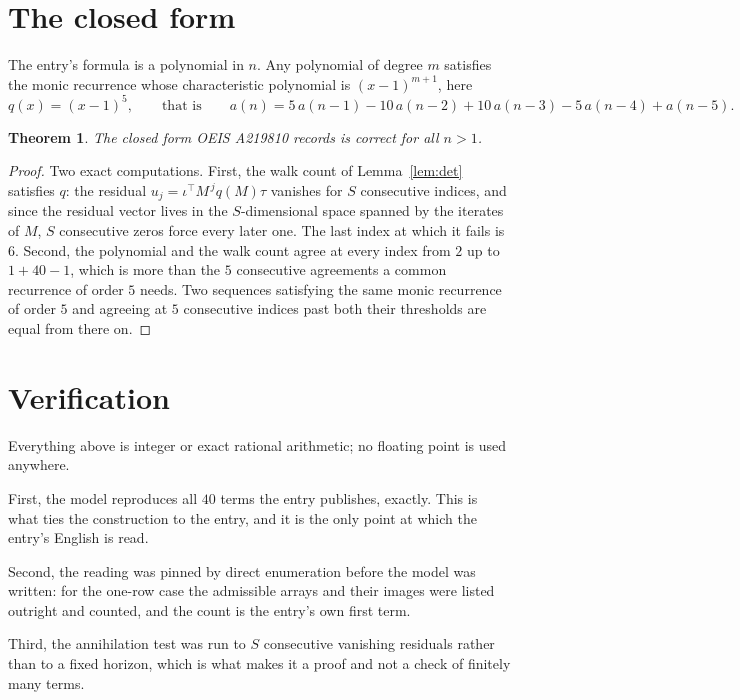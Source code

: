 \documentclass[11pt,a4paper]{article}
\theoremstyle{plain}
\newtheorem{theorem}{Theorem}
\theoremstyle{definition}
\begin{document}
\section{The closed form}

The entry's formula is a polynomial in $n$. Any polynomial of degree $m$ satisfies the monic
recurrence whose characteristic polynomial is $(x-1)^{m+1}$, here
\[
q(x)=(x-1)^{5},\qquad\text{that is}\qquad a(n)=5\,a(n-1) - 10\,a(n-2) + 10\,a(n-3) - 5\,a(n-4) + a(n-5).
\]

\begin{theorem}
The closed form OEIS A219810 records is correct for all $n>1$.
\end{theorem}

\begin{proof}
Two exact computations. First, the walk count of Lemma~\ref{lem:det} satisfies $q$: the
residual $u_j=\iota^{\!\top}M^{\,j}q(M)\tau$ vanishes for $S$ consecutive indices, and
since the residual vector lives in the $S$-dimensional space spanned by the iterates of $M$,
$S$ consecutive zeros force every later one. The last index at which it fails is $6$.
Second, the polynomial and the walk count agree at every index from $2$ up to
$1 + 40 - 1$, which is more than the $5$ consecutive agreements a
common recurrence of order $5$ needs. Two sequences satisfying the same monic recurrence
of order $5$ and agreeing at $5$ consecutive indices past both their thresholds are
equal from there on.
\end{proof}

\section{Verification}

Everything above is integer or exact rational arithmetic; no floating point is used anywhere.

First, the model reproduces all $40$ terms the entry publishes, exactly. This is what
ties the construction to the entry, and it is the only point at which the entry's English is
read.

Second, the reading was pinned by direct enumeration before the model was written: for the
one-row case the admissible arrays and their images were listed outright and counted, and the
count is the entry's own first term.

Third, the annihilation test was run to $S$ consecutive vanishing residuals rather than to a
fixed horizon, which is what makes it a proof and not a check of finitely many terms.
\end{document}
